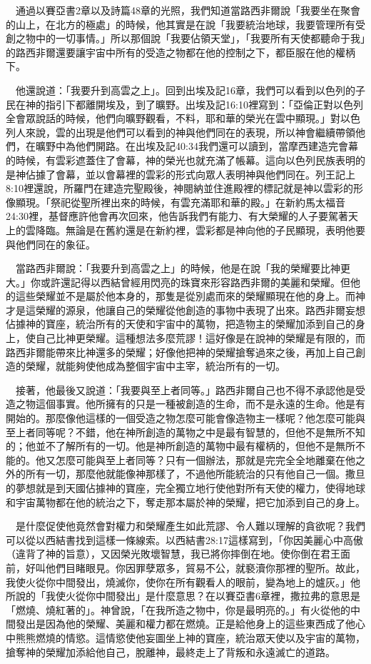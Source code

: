 \documentclass{book}
\begin{document}
　通過以賽亞書2章以及詩篇48章的光照，我們知道當路西非爾說「我要坐在聚會的山上，在北方的極處」的時候，他其實是在說「我要統治地球，我要管理所有受創之物中的一切事情。」所以那個說「我要佔領天堂」，「我要所有天使都聽命于我」的路西非爾還要讓宇宙中所有的受造之物都在他的控制之下，都臣服在他的權柄下。

　他還說道：「我要升到高雲之上」。回到出埃及記16章，我們可以看到以色列的子民在神的指引下都離開埃及，到了曠野。出埃及記16:10裡寫到：「亞倫正對以色列全會眾說話的時候，他們向曠野觀看，不料，耶和華的榮光在雲中顯現。」對以色列人來說，雲的出現是他們可以看到的神與他們同在的表現，所以神會繼續帶領他們，在曠野中為他們開路。在出埃及記40:34我們還可以讀到，當摩西建造完會幕的時候，有雲彩遮蓋住了會幕，神的榮光也就充滿了帳幕。這向以色列民族表明的是神佔據了會幕，並以會幕裡的雲彩的形式向眾人表明神與他們同在。列王記上8:10裡還說，所羅門在建造完聖殿後，神閱納並住進殿裡的標記就是神以雲彩的形像顯現。「祭祀從聖所裡出來的時候，有雲充滿耶和華的殿。」在新約馬太福音24:30裡，基督應許他會再次回來，他告訴我們有能力、有大榮耀的人子要駕著天上的雲降臨。無論是在舊約還是在新約裡，雲彩都是神向他的子民顯現，表明他要與他們同在的象征。

　當路西非爾說：「我要升到高雲之上」的時候，他是在說「我的榮耀要比神更大。」你或許還記得以西結曾經用閃亮的珠寶來形容路西非爾的美麗和榮耀。但他的這些榮耀並不是屬於他本身的，那隻是從別處而來的榮耀顯現在他的身上。而神才是這榮耀的源泉，他讓自己的榮耀從他創造的事物中表現了出來。路西非爾妄想佔據神的寶座，統治所有的天使和宇宙中的萬物，把造物主的榮耀加添到自己的身上，使自己比神更榮耀。這種想法多麼荒謬！這好像是在說神的榮耀是有限的，而路西非爾能帶來比神還多的榮耀；好像他把神的榮耀搶奪過來之後，再加上自己創造的榮耀，就能夠使他成為整個宇宙中主宰，統治所有的一切。

　接著，他最後又說道：「我要與至上者同等。」路西非爾自己也不得不承認他是受造之物這個事實。他所擁有的只是一種被創造的生命，而不是永遠的生命。他是有開始的。那麼像他這樣的一個受造之物怎麼可能會像造物主一樣呢？他怎麼可能與至上者同等呢？不錯，他在神所創造的萬物之中是最有智慧的，但他不是無所不知的；他並不了解所有的一切。他是神所創造的萬物中最有權柄的，但他不是無所不能的。他又怎麼可能與至上者同等？只有一個辦法，那就是完完全全地離棄在他之外的所有一切，那麼他就能像神那樣了，不過他所能統治的只有他自己一個。撒旦的夢想就是到天國佔據神的寶座，完全獨立地行使他對所有天使的權力，使得地球和宇宙萬物都在他的統治之下，奪走那本屬於神的榮耀，把它加添到自己的身上。

　是什麼促使他竟然會對權力和榮耀產生如此荒謬、令人難以理解的貪欲呢？我們可以從以西結書找到這樣一條線索。以西結書28:17這樣寫到，「你因美麗心中高傲（違背了神的旨意），又因榮光敗壞智慧，我已將你摔倒在地。使你倒在君王面前，好叫他們目睹眼見。你因罪孽眾多，貿易不公，就褻瀆你那裡的聖所。故此，我使火從你中間發出，燒滅你，使你在所有觀看人的眼前，變為地上的爐灰。」他所說的「我使火從你中間發出」是什麼意思？在以賽亞書6章裡，撒拉弗的意思是「燃燒、燒紅著的」。神曾說，「在我所造之物中，你是最明亮的。」有火從他的中間發出是因為他的榮耀、美麗和權力都在燃燒。正是給他身上的這些東西成了他心中熊熊燃燒的情慾。這情慾使他妄圖坐上神的寶座，統治眾天使以及宇宙的萬物，搶奪神的榮耀加添給他自己，脫離神，最終走上了背叛和永遠滅亡的道路。
\end{document}
